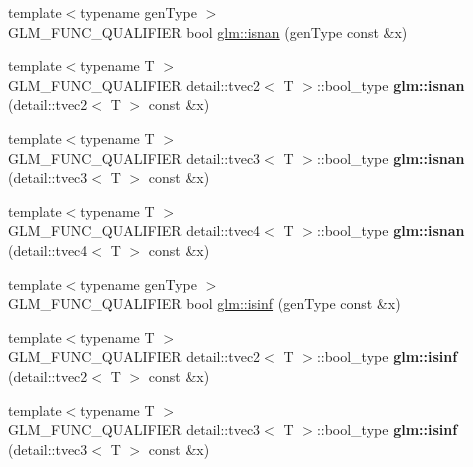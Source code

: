 \begin{DoxyCompactItemize}
\item 
{\footnotesize template$<$typename gen\+Type $>$ }\\G\+L\+M\+\_\+\+F\+U\+N\+C\+\_\+\+Q\+U\+A\+L\+I\+F\+I\+E\+R bool \hyperlink{group__core__func__common_ga8a9dec5200888766fbcb51b6a5898728}{glm\+::isnan} (gen\+Type const \&x)
\item 
\hypertarget{namespaceglm_a267a9851957896d360a7b9168897390e}{}{\footnotesize template$<$typename T $>$ }\\G\+L\+M\+\_\+\+F\+U\+N\+C\+\_\+\+Q\+U\+A\+L\+I\+F\+I\+E\+R detail\+::tvec2$<$ T $>$\+::bool\+\_\+type {\bfseries glm\+::isnan} (detail\+::tvec2$<$ T $>$ const \&x)\label{namespaceglm_a267a9851957896d360a7b9168897390e}

\item 
\hypertarget{namespaceglm_a58c44d2114b8e0ab1a3b6669ad6b9c2d}{}{\footnotesize template$<$typename T $>$ }\\G\+L\+M\+\_\+\+F\+U\+N\+C\+\_\+\+Q\+U\+A\+L\+I\+F\+I\+E\+R detail\+::tvec3$<$ T $>$\+::bool\+\_\+type {\bfseries glm\+::isnan} (detail\+::tvec3$<$ T $>$ const \&x)\label{namespaceglm_a58c44d2114b8e0ab1a3b6669ad6b9c2d}

\item 
\hypertarget{namespaceglm_a5c8244b11b884f57c38b5ce1b8938842}{}{\footnotesize template$<$typename T $>$ }\\G\+L\+M\+\_\+\+F\+U\+N\+C\+\_\+\+Q\+U\+A\+L\+I\+F\+I\+E\+R detail\+::tvec4$<$ T $>$\+::bool\+\_\+type {\bfseries glm\+::isnan} (detail\+::tvec4$<$ T $>$ const \&x)\label{namespaceglm_a5c8244b11b884f57c38b5ce1b8938842}

\item 
{\footnotesize template$<$typename gen\+Type $>$ }\\G\+L\+M\+\_\+\+F\+U\+N\+C\+\_\+\+Q\+U\+A\+L\+I\+F\+I\+E\+R bool \hyperlink{group__core__func__common_ga9fce6a337c7e8ad089b9dc17c70cb873}{glm\+::isinf} (gen\+Type const \&x)
\item 
\hypertarget{namespaceglm_a12f7a78a9bcc77fdd8b542b11b149962}{}{\footnotesize template$<$typename T $>$ }\\G\+L\+M\+\_\+\+F\+U\+N\+C\+\_\+\+Q\+U\+A\+L\+I\+F\+I\+E\+R detail\+::tvec2$<$ T $>$\+::bool\+\_\+type {\bfseries glm\+::isinf} (detail\+::tvec2$<$ T $>$ const \&x)\label{namespaceglm_a12f7a78a9bcc77fdd8b542b11b149962}

\item 
\hypertarget{namespaceglm_ae37f4d04e4a07794197f30ec2cf3f034}{}{\footnotesize template$<$typename T $>$ }\\G\+L\+M\+\_\+\+F\+U\+N\+C\+\_\+\+Q\+U\+A\+L\+I\+F\+I\+E\+R detail\+::tvec3$<$ T $>$\+::bool\+\_\+type {\bfseries glm\+::isinf} (detail\+::tvec3$<$ T $>$ const \&x)\label{namespaceglm_ae37f4d04e4a07794197f30ec2cf3f034}


\end{DoxyCompactItemize}
